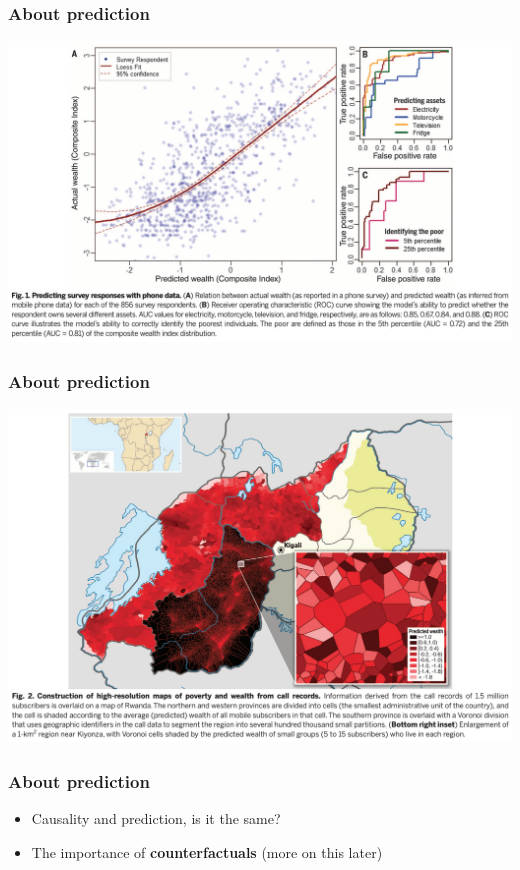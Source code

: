 \documentclass[aspectratio=43]{beamer}
\begin{document}
\begin{frame}
\frametitle{About prediction}
\centering

\includegraphics[width = \textwidth]{../img/blumenstock2}

\end{frame}

\begin{frame}
\frametitle{About prediction}
\centering

\includegraphics[width = \textwidth]{../img/blumenstock3}

\end{frame}

\begin{frame}
\frametitle{About prediction}
\centering

\begin{itemize}[<+->]
  \item Causality and prediction, is it the same?
  \item The importance of \textbf{counterfactuals} (more on this later)
\end{itemize}

\end{frame}
\end{document}
